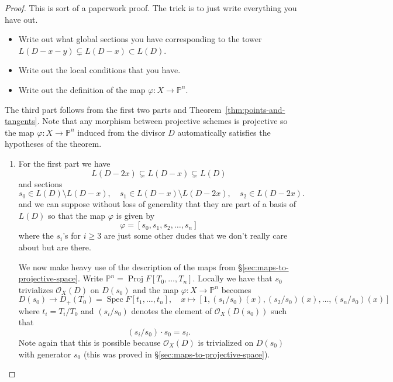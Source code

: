 \documentclass[12pt]{article}
\numberwithin{equation}{section}
\theoremstyle{definition}
\theoremstyle{remark}
\newcommand{\Ocal}{\mathcal{O}}
\newcommand{\PP}{\mathbb{P}}
\newcommand{\Spec}{\operatorname{Spec}}
\newcommand{\Proj}{\operatorname{Proj}}
\begin{document}
\begin{proof}
	This is sort of a paperwork proof. 
	The trick is to just write everything you have out.
	\begin{itemize}
		\item Write out what global sections you have corresponding to the tower $L(D-x-y) \subsetneq L(D-x) \subset L(D)$. 
		\item Write out the local conditions that you have. 
		\item Write out the definition of the map $\varphi: X \to \PP^n$. 
	\end{itemize}
The third part follows from the first two parts and Theorem~\ref{thm:points-and-tangents}. 
Note that any morphism between projective schemes is projective so the map $\varphi: X \to \PP^n$ induced from the divisor $D$ automatically satisfies the hypotheses of the theorem. 

\begin{enumerate}
\item For the first part we have 
 $$ L(D-2x) \subsetneq L(D-x) \subsetneq L(D) $$
and sections 
$$s_0 \in L(D)\setminus L(D-x), \quad s_1 \in L(D-x)\setminus L(D-2x), \quad s_2 \in L(D-2x).$$
and we can suppose without loss of generality that they are part of a basis of $L(D)$ so that the map $\varphi$ is given by
 $$ \varphi = [s_0,s_1,s_2,\ldots, s_n ] $$
where the $s_i$'s for $i\geq 3$ are just some other dudes that we don't really care about but are there.

We now make heavy use of the description of the maps from \S\ref{sec:maps-to-projective-space}.
Write $\PP^n = \Proj F[T_0,\ldots,T_n]$.
Locally we have that $s_0$ trivializes $\Ocal_X(D)$ on $D(s_0)$ and the map $\varphi: X\to \PP^n$ becomes
 $$ D(s_0) \to D_+(T_0) = \Spec F[t_1,\ldots,t_n], \quad x\mapsto [1, (s_1/s_0)(x), (s_2/s_0)(x), \ldots, (s_n/s_0)(x)] $$
where $t_i = T_i/T_0$ and $(s_i/s_0)$ denotes the element of $\Ocal_X(D(s_0))$ such that 
 $$ (s_i/s_0)\cdot s_0 = s_i. $$ 
Note again that this is possible because $\Ocal_X(D)$ is trivialized on $D(s_0)$ with generator $s_0$ (this was proved in \S\ref{sec:maps-to-projective-space}).


\end{enumerate}
\end{proof}
\end{document}
